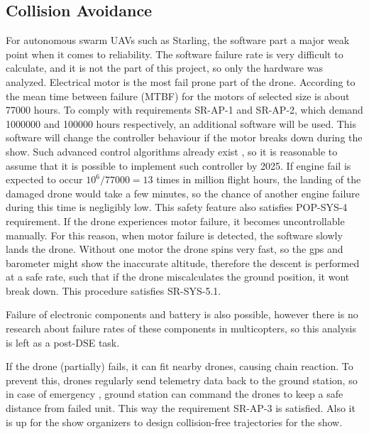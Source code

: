 \subsection{Collision Avoidance}
For autonomous swarm UAVs such as Starling,  the software part a major weak point when it comes to reliability. The software failure rate is very difficult to calculate, and it is not the part of this project, so only the hardware was analyzed. 
Electrical motor is the most fail prone part of the drone. According to the \cite{motor_fai_rate} mean time between failure (MTBF) for the motors of selected size is about 77000 hours. To comply with requirements SR-AP-1 and SR-AP-2, which demand 1000000 and 100000 hours respectively, an additional software will be used. This software will change the controller behaviour if the motor breaks down during the show. Such advanced control algorithms already exist \cite{fail_safe_controller}, so it is reasonable to assume that it is possible to implement such controller by 2025. If engine fail is expected to occur $10^6/77000 =  13$ times in million flight hours, the landing of the damaged drone would take a few minutes, so the chance of another engine failure during this time is negligibly low. This safety feature also satisfies POP-SYS-4 requirement.
If the drone experiences motor failure, it becomes uncontrollable manually. For this reason, when motor failure is detected, the software slowly lands the drone. Without one motor the drone spins very fast, so the gps and barometer might show the inaccurate altitude, therefore the descent is performed at a safe rate, such that if the drone miscalculates the ground position, it wont break down. This procedure satisfies SR-SYS-5.1. 

Failure of electronic components and battery is also possible, however there is no research about failure rates of these components in multicopters, so this analysis is left as a post-DSE task. 
 

If the drone (partially) fails, it can fit nearby drones, causing chain reaction. To prevent this, drones regularly send telemetry data back to the ground station, so in case of emergency , ground station can command the drones to keep a safe distance from failed unit. This way the requirement SR-AP-3 is satisfied. Also it is up for the show organizers to design collision-free trajectories for the show. 






